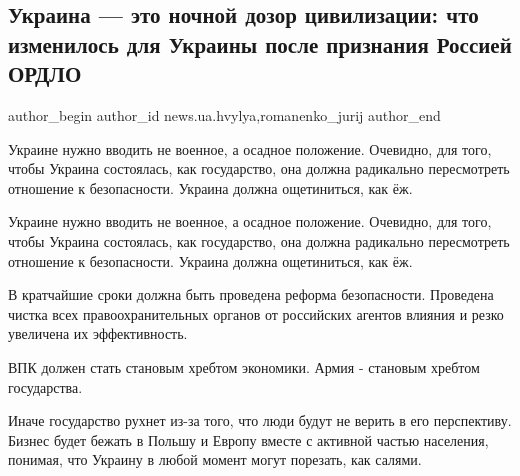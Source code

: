  
 
 
 
 
 
\subsection{Украина — это ночной дозор цивилизации: что изменилось для Украины после признания Россией ОРДЛО}
\label{sec:22_02_2022.stz.news.ua.hvylya.1.nochnoj_dozor}
 
\ifcmt
 author_begin
   author_id news.ua.hvylya,romanenko_jurij
 author_end
\fi

\begin{zznagolos}
Украине нужно вводить не военное, а осадное положение. Очевидно, для того,
чтобы Украина состоялась, как государство, она должна радикально пересмотреть
отношение к безопасности. Украина должна ощетиниться, как ёж.	
\end{zznagolos}


Украине нужно вводить не военное, а осадное положение. Очевидно, для того,
чтобы Украина состоялась, как государство, она должна радикально пересмотреть
отношение к безопасности. Украина должна ощетиниться, как ёж.

В кратчайшие сроки должна быть проведена реформа безопасности. Проведена чистка
всех правоохранительных органов от российских агентов влияния и резко увеличена
их эффективность.

ВПК должен стать становым хребтом экономики. Армия - становым хребтом
государства.

Иначе государство рухнет из-за того, что люди будут не верить в его
перспективу. Бизнес будет бежать в Польшу и Европу вместе с активной частью
населения, понимая, что Украину в любой момент могут порезать, как салями.

